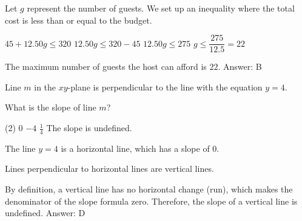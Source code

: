 \documentclass[11pt,paper=a4,answers]{exam}
\begin{document}
\begin{questions}
\begin{solution}
Let $g$ represent the number of guests. We set up an inequality where the total cost is less than or equal to the budget.
\vspace{5pt}
\begin{center}
$45 + 12.50g \leq 320$
\vspace{5pt}
$12.50g \leq 320 - 45$
\vspace{5pt}
$12.50g \leq 275$
\vspace{5pt}
$g \leq \dfrac{275}{12.5} = 22$
\end{center}
\vspace{5pt}
The maximum number of guests the host can afford is $22$.
\vspace{5pt}
Answer: \colorbox{yellow!100}{B}
\end{solution}

\vspace{1cm}

\question
Line $m$ in the $xy$-plane is perpendicular to the line with the equation $y = 4$.
\begin{center}
\end{center}
What is the slope of line $m$?
\begin{tasks}(2)
\task $0$
\task $-4$
\task $\frac{1}{4}$
\task The slope is undefined.
\end{tasks}

\begin{solution}
The line $y = 4$ is a horizontal line, which has a slope of $0$.
\vspace{5pt}
\begin{center}
Lines perpendicular to horizontal lines are vertical lines.
\end{center}
\vspace{5pt}
By definition, a vertical line has no horizontal change (run), which makes the denominator of the slope formula zero.
\vspace{5pt}
Therefore, the slope of a vertical line is undefined.
\vspace{5pt}
Answer: \colorbox{yellow!100}{D}
\end{solution}


\end{questions}
\end{document}
